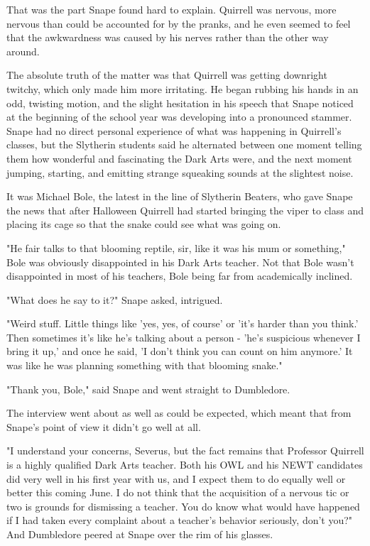 \documentclass[a4paper,11pt]{article}
\begin{document}
That was the part Snape found hard to explain. Quirrell was nervous, more nervous than could be accounted for by the pranks, and he even seemed to feel that the awkwardness was caused by his nerves rather than the other way around.

The absolute truth of the matter was that Quirrell was getting downright twitchy, which only made him more irritating. He began rubbing his hands in an odd, twisting motion, and the slight hesitation in his speech that Snape noticed at the beginning of the school year was developing into a pronounced stammer. Snape had no direct personal experience of what was happening in Quirrell's classes, but the Slytherin students said he alternated between one moment telling them how wonderful and fascinating the Dark Arts were, and the next moment jumping, starting, and emitting strange squeaking sounds at the slightest noise.

It was Michael Bole, the latest in the line of Slytherin Beaters, who gave Snape the news that after Halloween Quirrell had started bringing the viper to class and placing its cage so that the snake could see what was going on.

"He fair talks to that blooming reptile, sir, like it was his mum or something," Bole was obviously disappointed in his Dark Arts teacher. Not that Bole wasn't disappointed in most of his teachers, Bole being far from academically inclined.

"What does he say to it?" Snape asked, intrigued.

"Weird stuff. Little things like 'yes, yes, of course' or 'it's harder than you think.' Then sometimes it's like he's talking about a person - 'he's suspicious whenever I bring it up,' and once he said, 'I don't think you can count on him anymore.' It was like he was planning something with that blooming snake."

"Thank you, Bole," said Snape and went straight to Dumbledore.

The interview went about as well as could be expected, which meant that from Snape's point of view it didn't go well at all.

"I understand your concerns, Severus, but the fact remains that Professor Quirrell is a highly qualified Dark Arts teacher. Both his OWL and his NEWT candidates did very well in his first year with us, and I expect them to do equally well or better this coming June. I do not think that the acquisition of a nervous tic or two is grounds for dismissing a teacher. You do know what would have happened if I had taken every complaint about a teacher's behavior seriously, don't you?" And Dumbledore peered at Snape over the rim of his glasses.
\end{document}
